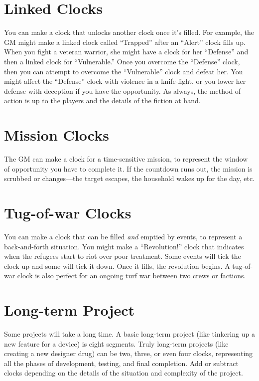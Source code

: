\documentclass[11pt,fleqn,a5paper]{book}
\begin{document}
\section{Linked Clocks}

You can make a clock that unlocks another clock once it’s filled. For example, the GM might make a linked clock called “Trapped” after an “Alert” clock fills up. When you fight a veteran warrior, she might have a clock for her “Defense” and then a linked clock for “Vulnerable.” Once you overcome the “Defense” clock, then you can attempt to overcome the “Vulnerable” clock and defeat her.  You might affect the “Defense” clock with violence in a knife-fight, or you lower her defense with deception if you have the opportunity. As always, the method of action is up to the players and the details of the fiction at hand.

\section{Mission Clocks}

The GM can make a clock for a time-sensitive mission, to represent the window of opportunity you have to complete it. If the countdown runs out, the mission is scrubbed or changes---the target escapes, the household wakes up for the day, etc.

\section{Tug-of-war Clocks}

You can make a clock that can be filled \emph{and} emptied by events, to represent a back-and-forth situation. You might make a “Revolution!” clock that indicates when the refugees start to riot over poor treatment. Some events will tick the clock up and some will tick it down. Once it fills, the revolution begins. A tug-of-war clock is also perfect for an ongoing turf war between two crews or factions.

\section{Long-term Project}

Some projects will take a long time. A basic long-term project (like tinkering up a new feature for a device) is eight segments. Truly long-term projects (like creating a new designer drug) can be two, three, or even four clocks, representing all the phases of development, testing, and final completion. Add or subtract clocks depending on the details of the situation and complexity of the project.
\end{document}
